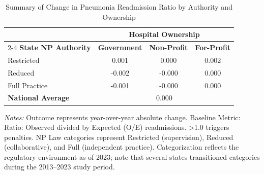 \begin{table}[htbp]
    \centering
    \caption{Summary of Change in Pneumonia Readmission Ratio by Authority and Ownership}
    \label{tab:d_rrp_excess_ratio_pn}
    \vspace{0.2cm}
    \begin{tabular}{lccc}
        \toprule
        & \multicolumn{3}{c}{\textbf{Hospital Ownership}} \\
        \cmidrule(lr){2-4}
        \textbf{State NP Authority} & \textbf{Government} & \textbf{Non-Profit} & \textbf{For-Profit} \\
        \midrule
        Restricted & 0.001 & 0.000 & 0.002 \\
        Reduced & -0.002 & -0.000 & 0.000 \\
        Full Practice & -0.001 & -0.000 & 0.000 \\
        \midrule
        \textbf{National Average} & \multicolumn{3}{c}{0.000} \\
        \bottomrule
    \end{tabular}
    \vspace{0.1cm}
    \begin{minipage}{0.85\textwidth}
        \footnotesize \textit{Notes:} Outcome represents year-over-year absolute change. Baseline Metric: Ratio: Observed divided by Expected (O/E) readmissions. >1.0 triggers penalties. NP Law categories represent Restricted (supervision), Reduced (collaborative), and Full (independent practice). Categorization reflects the regulatory environment as of 2023; note that several states transitioned categories during the 2013--2023 study period.
    \end{minipage}
\end{table}